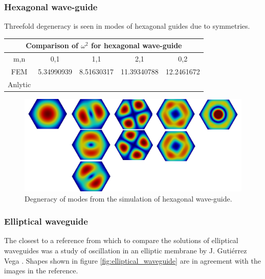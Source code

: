 \subsubsection{Hexagonal wave-guide}

Threefold degeneracy is seen in modes of hexagonal guides due to symmetries.

\begin{center}
\begin{tabular}{|c|c|c|c|c|}
\hline
\multicolumn{5}{|c|}{Comparison of $\omega^2$ for hexagonal wave-guide} \\
\hline 
m,n & 0,1 & 1,1 & 2,1 & 0,2 \\ 
\hline 
FEM     & 5.34990939 & 8.51630317 & 11.39340788 & 12.2461672 \\ 
\hline 
Anlytic &  &  &  &  \\ 
\hline 
\end{tabular} 
\label{tab:hex_wav_comparison}
\end{center}

\begin{figure}
\centering
\includegraphics[scale=0.07]{./img/hexagonal_waveguide.pdf}
\caption{Degneracy of modes from the simulation of hexagonal wave-guide.}
\label{fig:hexagonal_waveguide}
\end{figure}
\subsubsection{Elliptical waveguide}

The closest to a reference from which to compare the solutions of elliptical waveguides was a study of oscillation in an elliptic membrane by J. Guti\'errez Vega \cite{J.Gutierrez-Vega1999}. Shapes shown in figure \ref{fig:elliptical_waveguide} are in agreement with the images in the reference. 

